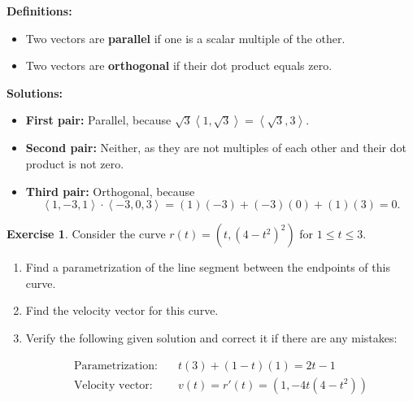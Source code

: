 \documentclass[12pt]{article}
\theoremstyle{plain}
\theoremstyle{definition}
\newtheorem{Ej}[Th]{Exercise}         %
\theoremstyle{remark}
\renewcommand{\leq}{\leqslant}      %
\renewcommand{\:}{\colon}           %
\renewcommand{\.}{\Cdot}                %
\newcommand{\br}[1]{\left\langle #1\right\rangle}
\begin{document}
  \begin{ptcb}
    \textbf{Definitions:}
    \begin{itemize}
      \item Two vectors are \textbf{parallel} if one is a scalar multiple of the other.
      \item Two vectors are \textbf{orthogonal} if their dot product equals zero.
    \end{itemize}
  
    \textbf{Solutions:}
    \begin{itemize}
      \item \textbf{First pair:} Parallel, because $\sqrt{3}\br{1, \sqrt{3}} = \br{\sqrt{3}, 3}.$
      \item \textbf{Second pair:} Neither, as they are not multiples of each other and their dot product is not zero.
      \item \textbf{Third pair:} Orthogonal, because
        $$\br{1, -3, 1} \cdot \br{-3, 0, 3} = (1)(-3) + (-3)(0) + (1)(3) = 0.$$
    \end{itemize}
  \end{ptcb}
  \iffalse
  \begin{Ej}
    Consider the curve $r(t) = (t, (4 - t^2)^2)$ for $1 \leq t \leq 3$. 
    \begin{enumerate}
        \item Find a parametrization of the line segment between the endpoints of this curve.
        \item Find the velocity vector for this curve.
        \item Verify the following given solution and correct it if there are any mistakes:
        \begin{ptcb}
          \begin{align*}
            \text{Parametrization:} & \quad t(3) + (1 - t)(1) = 2t - 1 \\
            \text{Velocity vector:} & \quad v(t) = r'(t) = (1, -4t(4 - t^2))
          \end{align*}
        \end{ptcb}
            
    \end{enumerate}
    \end{Ej}
\end{document}
